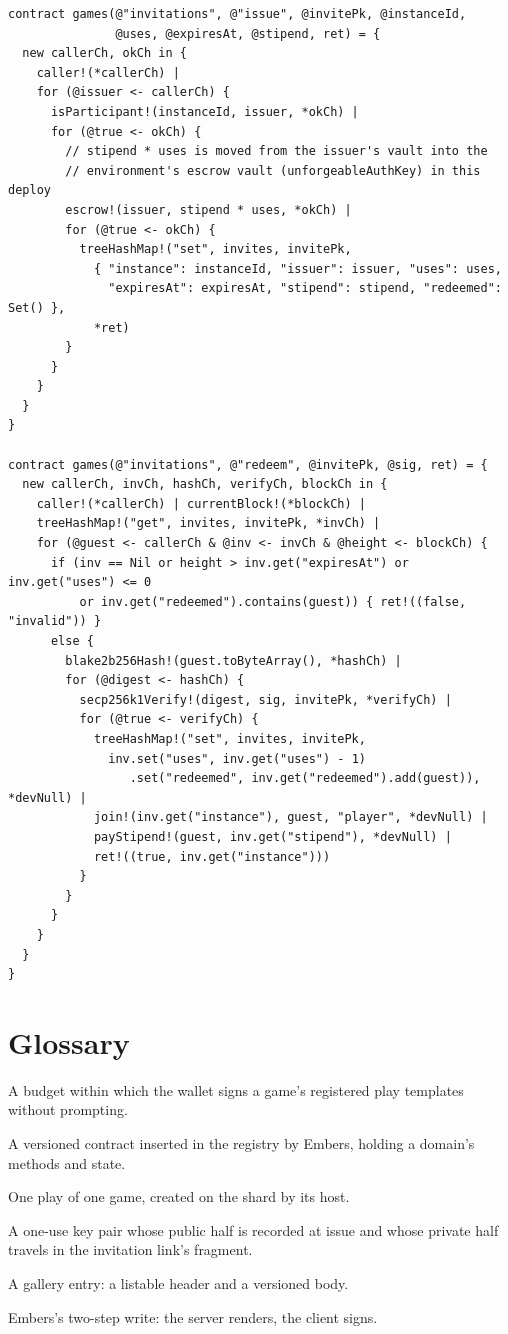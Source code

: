 \documentclass[11pt]{article}
\theoremstyle{definition}
\theoremstyle{remark}
\newcommand{\Em}{Embers}
\begin{document}
\begin{lstlisting}[language=Rho]
contract games(@"invitations", @"issue", @invitePk, @instanceId,
               @uses, @expiresAt, @stipend, ret) = {
  new callerCh, okCh in {
    caller!(*callerCh) |
    for (@issuer <- callerCh) {
      isParticipant!(instanceId, issuer, *okCh) |
      for (@true <- okCh) {
        // stipend * uses is moved from the issuer's vault into the
        // environment's escrow vault (unforgeableAuthKey) in this deploy
        escrow!(issuer, stipend * uses, *okCh) |
        for (@true <- okCh) {
          treeHashMap!("set", invites, invitePk,
            { "instance": instanceId, "issuer": issuer, "uses": uses,
              "expiresAt": expiresAt, "stipend": stipend, "redeemed": Set() },
            *ret)
        }
      }
    }
  }
}

contract games(@"invitations", @"redeem", @invitePk, @sig, ret) = {
  new callerCh, invCh, hashCh, verifyCh, blockCh in {
    caller!(*callerCh) | currentBlock!(*blockCh) |
    treeHashMap!("get", invites, invitePk, *invCh) |
    for (@guest <- callerCh & @inv <- invCh & @height <- blockCh) {
      if (inv == Nil or height > inv.get("expiresAt") or inv.get("uses") <= 0
          or inv.get("redeemed").contains(guest)) { ret!((false, "invalid")) }
      else {
        blake2b256Hash!(guest.toByteArray(), *hashCh) |
        for (@digest <- hashCh) {
          secp256k1Verify!(digest, sig, invitePk, *verifyCh) |
          for (@true <- verifyCh) {
            treeHashMap!("set", invites, invitePk,
              inv.set("uses", inv.get("uses") - 1)
                 .set("redeemed", inv.get("redeemed").add(guest)), *devNull) |
            join!(inv.get("instance"), guest, "player", *devNull) |
            payStipend!(guest, inv.get("stipend"), *devNull) |
            ret!((true, inv.get("instance")))
          }
        }
      }
    }
  }
}
\end{lstlisting}

\section{Glossary}

\begin{description}[leftmargin=*,itemsep=1pt]
\item[Allowance] A budget within which the wallet signs a game's registered play
  templates without prompting.
\item[Environment] A versioned contract inserted in the registry by \Em{}, holding a
  domain's methods and state.
\item[Instance] One play of one game, created on the shard by its host.
\item[Invite key] A one-use key pair whose public half is recorded at issue and whose
  private half travels in the invitation link's fragment.
\item[Play record] A gallery entry: a listable header and a versioned body.
\item[Prepare / send] \Em{}'s two-step write: the server renders, the client signs.
\end{description}
\end{document}
